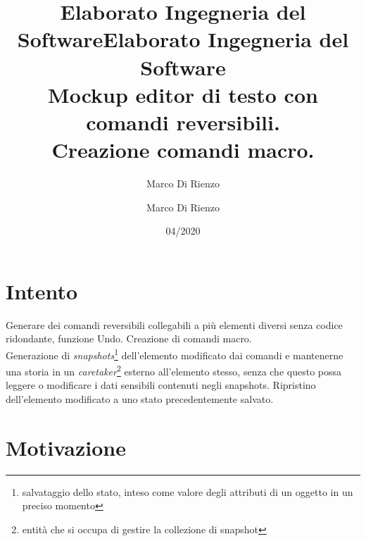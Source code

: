 \documentclass[12pt]{article}
\title{Elaborato Ingegneria del Software}
\author{Marco Di Rienzo }
\title{Elaborato Ingegneria del Software \\
\hfill \break \large Mockup editor di testo con comandi reversibili.\\
Creazione comandi macro.}
\author{Marco Di Rienzo}
\date{04/2020}
\begin{document}
\maketitle
\newpage
\tableofcontents 

\newpage
\section{Intento}
Generare dei comandi reversibili collegabili a più elementi diversi senza codice ridondante, funzione Undo.
Creazione di comandi macro.\\
Generazione di \emph{snapshots}\footnote{salvataggio dello stato, inteso come valore degli attributi di un oggetto in un preciso momento} dell'elemento modificato dai comandi e mantenerne una storia in un \emph{caretaker}\footnote{entità che si occupa di gestire la collezione di snapshot} esterno all'elemento stesso, senza che questo possa leggere o modificare i dati sensibili contenuti negli snapshots.
Ripristino dell'elemento modificato a uno stato precedentemente salvato.

\section{Motivazione}
\end{document}

